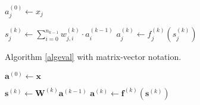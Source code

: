 \documentclass{article}
\begin{document}
      \begin{algorithm}
        \caption{%
          Evaluate the given input and produce the result in the output layer.
        } \label{algeval}
        \begin{algorithmic}
              \State $a_j^{(0)} \gets x_j$
            \EndFor

                \State $
                  s_j^{(k)} \gets
                    \sum_{i=0}^{n_{k-1}} w_{j,i}^{(k)} \cdot a_i^{(k-1)}
                $
                \State $a_j^{(k)} \gets f_j^{(k)} \left( s_j^{(k)} \right)$
              \EndFor
            \EndFor
          \EndProcedure
        \end{algorithmic}
      \end{algorithm}

      \begin{algorithm}
        \caption{Algorithm \ref{algeval} with matrix-vector notation.}
        \begin{algorithmic}
            \State $\mathbf{a}^{(0)} \gets \mathbf{x}$

              \State $
                \mathbf{s}^{(k)} \gets \mathbf{W}^{(k)} \mathbf{a}^{(k-1)}
              $
              \State $
                \mathbf{a}^{(k)} \gets
                  \mathbf{f}^{(k)} \left( \mathbf{s}^{(k)} \right)
              $
            \EndFor
          \EndProcedure
        \end{algorithmic}
      \end{algorithm}
\end{document}
